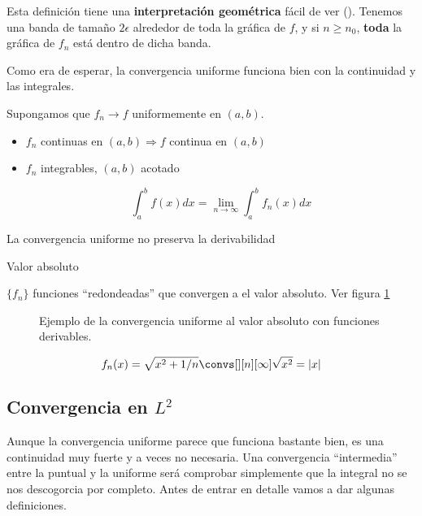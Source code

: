 		Esta definición tiene una \textbf{interpretación geométrica} fácil de ver (). Tenemos una banda de tamaño $2\epsilon$ alrededor de toda la gráfica de $f$, y si $n \geq n_0$, {\bf toda} la gráfica de $f_n$ está dentro de dicha banda.

		Como era de esperar, la convergencia uniforme funciona bien con la continuidad y las integrales.

		\begin{theorem}

			Supongamos que $f_n \rightarrow f$ uniformemente en $(a,b)$.

			\begin{itemize}
				\item $f_n$ continuas en $(a,b) \Rightarrow f$ continua en $(a,b)$

				\item $f_n$ integrables, $(a,b)$ acotado

				\[\int^{b}_{a} f(x) dx = \lim_{n \rightarrow \infty} \int^{b}_{a} f_n(x) dx \]
			\end{itemize}

			\obs La convergencia uniforme no preserva la derivabilidad

		\end{theorem}

		\begin{example}{Valor absoluto}

			$\{f_n\}$ funciones ``redondeadas'' que convergen a el valor absoluto. Ver figura \ref{fig:convergenciaValorAbsoluto}

			\begin{figure}[thbp]
			\centering
			\caption{Ejemplo de la convergencia uniforme al valor absoluto con funciones derivables.}
			\label{fig:convergenciaValorAbsoluto}
			\end{figure}

			\[f_n(x) = \sqrt{x^2 + 1/n} \convs[][n][\infty] \sqrt{x^2} = |x| \]

		\end{example}

	\subsection{Convergencia en $L^2$}

		Aunque la convergencia uniforme parece que funciona bastante bien, es una continuidad muy fuerte y a veces no necesaria. Una convergencia ``intermedia'' entre la puntual y la uniforme será comprobar simplemente que la integral no se nos descogorcia por completo. Antes de entrar en detalle vamos a dar algunas definiciones.

